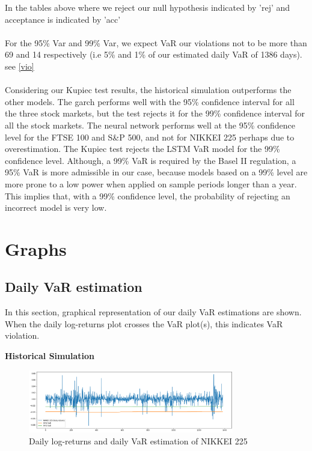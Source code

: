 \documentclass[a4paper,11pt,oneside]{book}
\begin{document}
In the tables above where we reject our null hypothesis indicated by 'rej' and acceptance is indicated by 'acc'\\\\
For the 95\% Var and 99\% Var, we expect VaR our violations not to be more than 69 and 14 respectively (i.e 5\% and 1\% of our estimated daily VaR of 1386 days). see \autoref{vio}  \\\\
Considering our Kupiec test results, the historical simulation outperforms the other models. The garch performs well with the 95\% confidence interval for all the three stock markets, but the test rejects it for the 99\% confidence interval for all the stock markets. The neural network performs well at the 95\% confidence level for the FTSE 100 and S\&P 500, and not for NIKKEI 225 perhaps due to overestimation. The Kupiec test rejects the LSTM VaR model for the 99\% confidence level. Although, a 99\% VaR
is required by the Basel II regulation, a 95\% VaR is more admissible in our case,
because models based on a 99\% level are more prone to a low power when
applied on sample periods longer than a year. This implies that, with a 99\%
confidence level, the probability of rejecting an incorrect model is very low.























\section{Graphs}
\subsection{Daily VaR estimation}
In this section, graphical representation of our daily VaR estimations are shown. When the daily log-returns plot crosses the VaR plot(s), this indicates VaR violation. \newline

\textbf{Historical Simulation}
\begin{figure}[!h]
	\centering
	\includegraphics[width=0.8\textwidth]{figures/HISTN}
	\caption{Daily log-returns and daily VaR estimation of NIKKEI 225}
	\label{HistN}
\end{figure}
\end{document}
